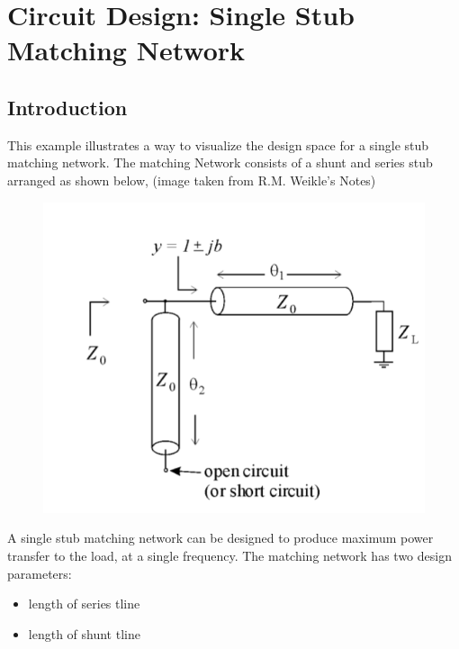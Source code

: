 \documentclass[letterpaper,10pt,english]{sphinxmanual}
\begin{document}
\section{Circuit Design: Single Stub Matching Network}
\label{examples/matching_single_stub:example-matching-single-stub}\label{examples/matching_single_stub:circuit-design-single-stub-matching-network}\label{examples/matching_single_stub::doc}

\subsection{Introduction}
\label{examples/matching_single_stub:introduction}
This example illustrates a way to visualize the design space for a single stub matching network. The matching Network consists of a shunt and series stub arranged as shown below, (image taken from R.M. Weikle's Notes)
\begin{figure}[htbp]
\centering

\includegraphics{single_stub_matching_diagram.png}
\end{figure}

A single stub matching network can be designed to produce maximum power transfer to the load, at a single frequency. The matching network has two design parameters:
\begin{itemize}
\item {} 
length of series tline

\item {} 
length of shunt tline

\end{itemize}
\end{document}
